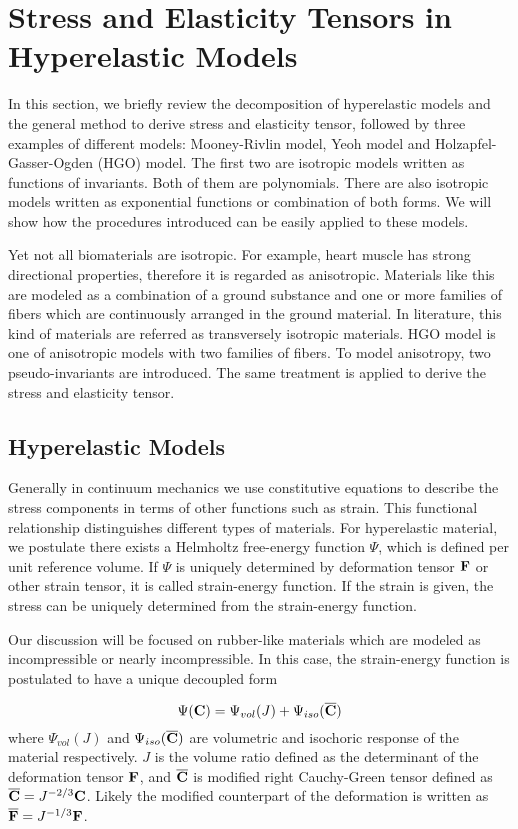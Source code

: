 \section{Stress and Elasticity Tensors in Hyperelastic Models} \label{general}
In this section, we briefly review the decomposition of hyperelastic models and the general method to derive stress and elasticity tensor, followed by three examples of different models: Mooney-Rivlin model, Yeoh model and Holzapfel-Gasser-Ogden (HGO) model. The first two are isotropic models written as functions of invariants. Both of them are polynomials. There are also isotropic models written as exponential functions or combination of both forms. We will show how the procedures introduced can be easily applied to these models.

Yet not all biomaterials are isotropic. For example, heart muscle has strong directional properties, therefore it is regarded as anisotropic. Materials like this are modeled as a combination of a ground substance and one or more families of fibers which are continuously arranged in the ground material. In literature, this kind of materials are referred as transversely isotropic materials. HGO model is one of anisotropic models with two families of fibers. To model anisotropy, two pseudo-invariants are introduced. The same treatment is applied to derive the stress and elasticity tensor.

%
\subsection{Hyperelastic Models}
Generally in continuum mechanics we use constitutive equations to describe the stress components in terms of other functions such as strain. This functional relationship distinguishes different types of materials. For hyperelastic material, we postulate there exists a Helmholtz free-energy function $\Psi$, which is defined per unit reference volume. If $\Psi$ is uniquely determined by deformation tensor $\bold{F}$ or other strain tensor, it is called strain-energy function. If the strain is given, the stress can be uniquely determined from the strain-energy function.  

Our discussion will be focused on rubber-like materials which are modeled as incompressible or nearly incompressible. In this case, the strain-energy function is postulated to have a unique decoupled form

\begin{equation} \label{energy_split}
\Psi(\bold{C}) = \Psi_{vol}(J) + \Psi_{iso}(\overline{\bold{C}})
\end{equation}
where $\Psi_{vol}(J)$ and $\Psi_{iso}(\overline{\bold{C}})$ are volumetric and isochoric response of the material respectively. $J$ is the volume ratio defined as the determinant of the deformation tensor $\bold{F}$, and $\overline{\bold{C}}$ is modified right Cauchy-Green tensor defined as 
$\overline{\bold{C}}  = J^{-2/3} \bold{C}$. Likely the modified counterpart of the deformation is written as $\overline{\bold{F}} = J^{-1/3} \bold{F}$. 

